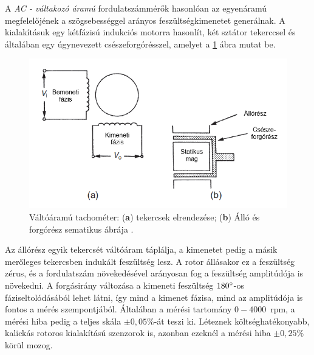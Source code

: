 A \textit{AC - váltakozó áramú} fordulatszámmérők hasonlóan az egyenáramú megfelelőjének a szögsebességgel arányos feszültségkimenetet generálnak. A kialakításuk egy kétfázisú indukciós motorra hasonlít, két sztátor tekerccsel és általában egy úgynevezett csészeforgórésszel, amelyet a \ref{actach} ábra mutat be. 
\begin{figure}
	\centering
	\includegraphics[width=\columnwidth*7/10]{figures/actach.png}
	\caption{Váltóáramú tachométer: (\textbf{a}) tekercsek elrendezése; (\textbf{b}) Álló és forgórész sematikus ábrája \cite{Morris2016b}.}
	\label{actach}
\end{figure}
Az állórész egyik tekercsét váltóáram táplálja, a kimenetet pedig a másik merőleges tekercsben indukált feszültség lesz. A rotor állásakor ez a feszültség zérus, és a fordulatszám növekedésével arányosan fog a feszültség amplitúdója is növekedni. A forgásirány változása a kimeneti feszültség $180\degree$-os fáziseltolódásából lehet látni, így mind a kimenet fázisa, mind az amplitúdója is fontos a mérés szempontjából. Általában a mérési tartomány $0-4000$~rpm, a mérési hiba pedig a teljes skála $\pm0,05\%$-át teszi ki. Léteznek költséghatékonyabb, kalickás rotoros kialakítású szenzorok is, azonban ezeknél a mérési hiba $\pm 0,25\%$ körül mozog.


